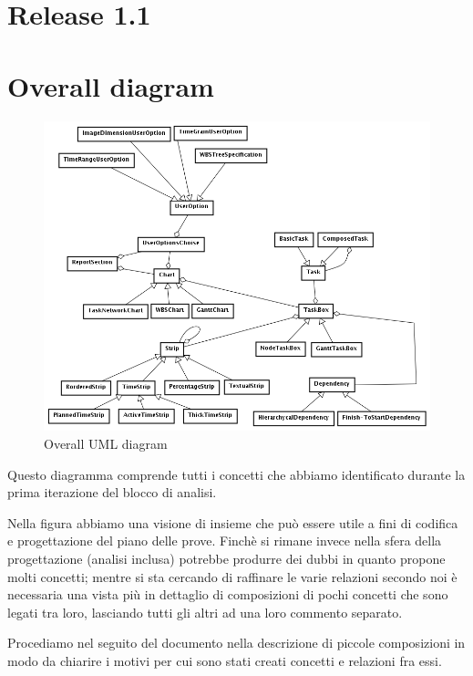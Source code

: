 \chapter*{Release \textbf{1.1}}

\chapter{Overall diagram}

\begin{figure}[h!] 
	\centering
	\includegraphics[width=1\textwidth]{../Milestone1-DomainModel/DomainModel.png}
	\caption{Overall UML diagram}
	\label{fig:overallDiagram} 
\end{figure}

Questo diagramma comprende tutti i concetti che abbiamo identificato durante la
prima iterazione del blocco di analisi. 

Nella figura abbiamo una visione di insieme che pu\`o essere utile a fini di
codifica e progettazione del piano delle prove. Finch\`e si rimane invece nella
sfera della progettazione (analisi inclusa) potrebbe produrre dei dubbi in
quanto propone molti concetti; mentre si sta cercando di raffinare le varie relazioni
secondo noi \`e necessaria una vista pi\`u in dettaglio di composizioni
di pochi concetti che sono legati tra loro, lasciando tutti gli altri ad una
loro commento separato.

Procediamo nel seguito del documento nella descrizione di piccole composizioni
in modo da chiarire i motivi per cui sono stati creati concetti e relazioni fra
essi.

